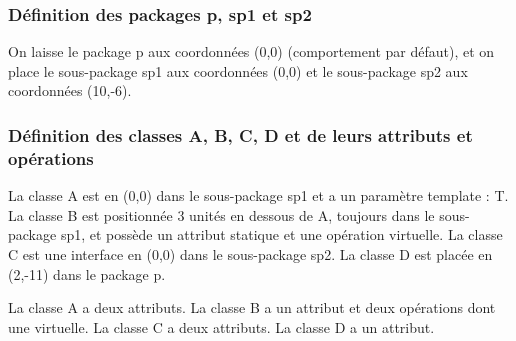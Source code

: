\documentclass[a4paper,11pt]{report}
\newcommand{\inputTikZ}[1]{%
  }%
\newcommand{\inputTikZ}[1]{%
    \texttt{[image: fig/\#1.pdf]}%
  }%
\begin{document}
\subsubsection{Définition des packages p, sp1 et sp2}

On laisse le package p aux coordonnées (0,0) (comportement par défaut), et on place le sous-package sp1 aux coordonnées (0,0) et le sous-package sp2 aux coordonnées (10,-6).

{\color{red!70!black}
\vspace{-0.4cm}
\vspace{-0.4cm}
\vspace{-0.4cm}

}

\begin{center}
\inputTikZ{classdiagstep1}
\end{center}

\subsubsection{Définition des classes A, B, C, D et de leurs attributs et opérations}

La classe A est en (0,0) dans le sous-package sp1 et a un paramètre template : T. La classe B est positionnée 3 unités en dessous de A, toujours dans le sous-package sp1, et  possède un attribut statique et une opération virtuelle. La classe C est une interface en (0,0) dans le sous-package sp2. La classe D est placée en (2,-11) dans le package p.

La classe A a deux attributs. La classe B a un attribut et deux opérations dont une virtuelle. La classe C a deux attributs. La classe D a un attribut.

\vspace{-0.4cm}
{\color{red!70!black}
\vspace{-0.4cm}
}
\vspace{-0.4cm}
{\color{red!70!black}
\vspace{-0.4cm}
}
\vspace{-0.4cm}
{\color{red!70!black}
\vspace{-0.4cm}
}

\end{document}
